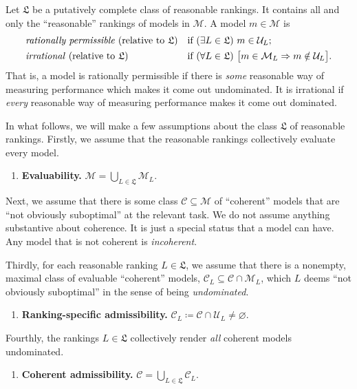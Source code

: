 \documentclass[11pt]{article}
\theoremstyle{definition}
\theoremstyle{remark}
\newcommand{\M}{\mathcal M}
\newcommand{\C}{\mathcal C}
\newcommand{\U}{\mathcal U}
\newcommand{\Lf}{\mathfrak L}
\begin{document}
Let $\Lf$ be a putatively complete class of reasonable rankings. It contains all and only the ``reasonable'' rankings of models in $\M$. A model $m\in\M$ is
\begin{align*}
&\text{\emph{rationally permissible} (relative to $\Lf$)}&&\text{if }(\exists L\in\Lf)\ m\in\U_L;\\
&\text{\emph{irrational} (relative to $\Lf$)}&&\text{if }(\forall L\in\Lf)\ \bigl[m\in\M_L\Rightarrow m\notin\U_L\bigr].
\end{align*}
That is, a model is rationally permissible if there is \textit{some} reasonable way of measuring performance which makes it come out undominated. It is irrational if \textit{every} reasonable way of measuring performance makes it come out dominated.


In what follows, we will make a few assumptions about the class $\Lf$ of reasonable rankings. Firstly, we assume that the reasonable rankings collectively evaluate every model.
\begin{enumerate}[label=\textbf{(E)},leftmargin=*]
\item \textbf{Evaluability.} $\M=\bigcup_{L\in\mathfrak L}\M_L$.
\end{enumerate}

Next, we assume that there is some class $\C\subseteq\M$ of ``coherent'' models that are ``not obviously suboptimal'' at the relevant task. We do not assume anything substantive about coherence. It is just a special status that a model can have. Any model that is not coherent is \emph{incoherent}. 


Thirdly, for each reasonable ranking $L\in\mathfrak L$, we assume that there is a nonempty, maximal class of evaluable ``coherent'' models, $\C_L\subseteq\C\cap\M_L$, which $L$ deems ``not obviously suboptimal'' in the sense of being \textit{undominated}.
\begin{enumerate}[label=\textbf{(LA)},leftmargin=*]
\item \textbf{Ranking-specific admissibility.} $\C_L\coloneqq \C\cap\U_L\neq\varnothing$.
\end{enumerate}

Fourthly, the rankings $L\in\mathfrak L$ collectively render \textit{all} coherent models undominated.
\begin{enumerate}[label=\textbf{(CA)},leftmargin=*]
\item \textbf{Coherent admissibility.} $\C=\bigcup_{L\in\mathfrak L}\C_L$.
\end{enumerate}
\end{document}
